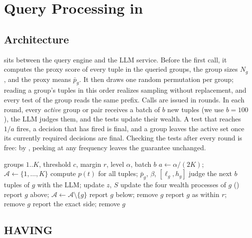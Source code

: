 \section{Query Processing in \sys}
\label{sec:processing}

\subsection{Architecture}

\sys{} sits between the query engine and the LLM service.
Before the first call, it computes the proxy score of every tuple in the queried groups, the group sizes $N_g$, and the proxy means $\bar p_g$.
It then draws one random permutation per group; reading a group's tuples in this order realizes sampling without replacement, and every test of the group reads the same prefix.
Calls are issued in rounds.
In each round, every \emph{active} group or pair receives a batch of $b$ new tuples (we use $b=100$), the LLM judges them, and the tests update their wealth.
A test that reaches $1/a$ fires, a decision that has fired is final, and a group leaves the active set once its currently required decisions are final.
Checking the tests after every round is free: by , peeking at any frequency leaves the guarantee unchanged.

\begin{algorithm}[t]
\caption{\sys{} for HAVING}
\label{alg:having}
\begin{algorithmic}[1]
\Require groups $1..K$, threshold $c$, margin $r$, level $\alpha$, batch $b$
\State $a\gets\alpha/(2K)$;\ \ $\mathcal{A}\gets\{1,\dots,K\}$ 
\State compute $p(t)$ for all tuples; $\bar p_g$, $\beta$, $[\ell_g,h_g]$
    \State judge the next $b$ tuples of $g$ with the LLM; update $z$, $S$
    \State update the four wealth processes of $g$ ()
     report $g$ above; $\mathcal{A}\gets\mathcal{A}\setminus\{g\}$
     report $g$ below; remove $g$
     report $g$ as within $r$; remove $g$
     report the exact side; remove $g$
    \EndIf
  \EndFor
\EndWhile
\end{algorithmic}
\end{algorithm}

\subsection{HAVING}

